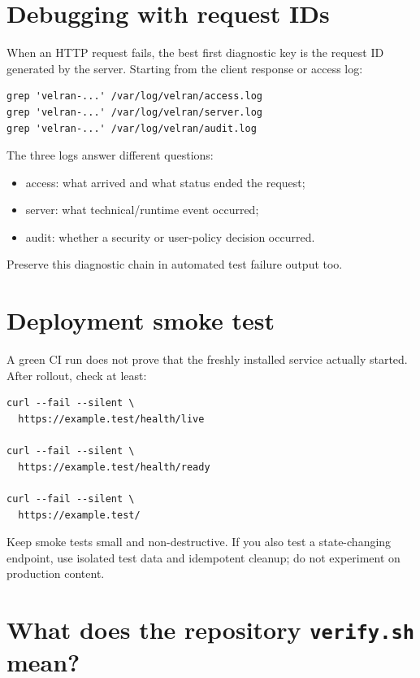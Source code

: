 \section{Debugging with request IDs}

When an HTTP request fails, the best first diagnostic key is the request ID generated by the server. Starting from the client response or access log:

\begin{lstlisting}
grep 'velran-...' /var/log/velran/access.log
grep 'velran-...' /var/log/velran/server.log
grep 'velran-...' /var/log/velran/audit.log
\end{lstlisting}

The three logs answer different questions:

\begin{itemize}
  \item access: what arrived and what status ended the request;
  \item server: what technical/runtime event occurred;
  \item audit: whether a security or user-policy decision occurred.
\end{itemize}

Preserve this diagnostic chain in automated test failure output too.

\section{Deployment smoke test}

A green CI run does not prove that the freshly installed service actually started. After rollout, check at least:

\begin{lstlisting}
curl --fail --silent \
  https://example.test/health/live

curl --fail --silent \
  https://example.test/health/ready

curl --fail --silent \
  https://example.test/
\end{lstlisting}

Keep smoke tests small and non-destructive. If you also test a state-changing endpoint, use isolated test data and idempotent cleanup; do not experiment on production content.

\section{What does the repository \texttt{verify.sh} mean?}

